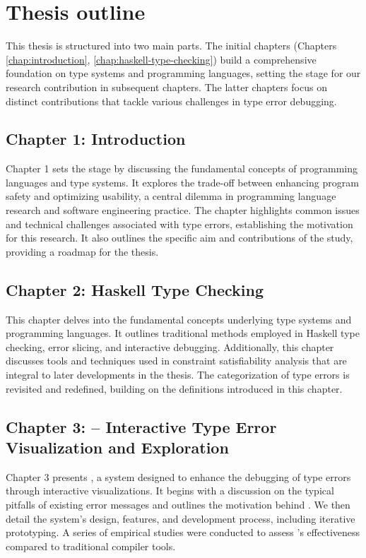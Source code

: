 \section{Thesis outline}

 This thesis is structured into two main parts. The initial chapters (Chapters \ref{chap:introduction}, \ref{chap:haskell-type-checking}) build a comprehensive foundation on type systems and programming languages, setting the stage for our research contribution in subsequent chapters. The latter chapters focus on distinct contributions that tackle various challenges in type error debugging.

\subsection*{Chapter 1: Introduction}
Chapter 1 sets the stage by discussing the fundamental concepts of programming languages and type systems. It explores the trade-off between enhancing program safety and optimizing usability, a central dilemma in programming language research and software engineering practice. The chapter highlights common issues and technical challenges associated with type errors, establishing the motivation for this research. It also outlines the specific aim and contributions of the study, providing a roadmap for the thesis.

\subsection*{Chapter 2: Haskell Type Checking}
This chapter delves into the fundamental concepts underlying type systems and programming languages. It outlines traditional methods employed in Haskell type checking, error slicing, and interactive debugging. Additionally, this chapter discusses tools and techniques used in constraint satisfiability analysis that are integral to later developments in the thesis. The categorization of type errors is revisited and redefined, building on the definitions introduced in this chapter.
    
\subsection*{Chapter 3: \chameleon{} -- Interactive Type Error Visualization and Exploration}
Chapter 3 presents \chameleon{}, a system designed to enhance the debugging of type errors through interactive visualizations. It begins with a discussion on the typical pitfalls of existing error messages and outlines the motivation behind \chameleon{}. We then detail the system's design, features, and development process, including iterative prototyping. A series of empirical studies were conducted to assess \chameleon{}'s effectiveness compared to traditional compiler tools.
    
